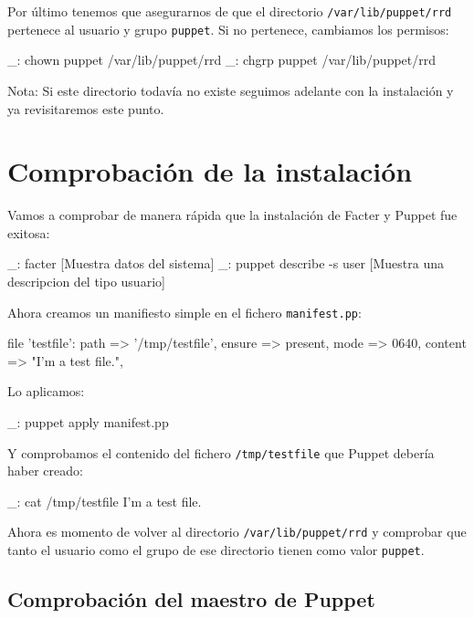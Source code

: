 Por último tenemos que asegurarnos de que el directorio \texttt{/var/lib/puppet/rrd} pertenece al usuario y grupo \texttt{puppet}. Si no pertenece, cambiamos los permisos:

\begin{bashcode}
_: chown puppet /var/lib/puppet/rrd
_: chgrp puppet /var/lib/puppet/rrd
\end{bashcode}

Nota: Si este directorio todavía no existe seguimos adelante con la instalación y ya revisitaremos este punto.


\section{Comprobación de la instalación}

Vamos a comprobar de manera rápida que la instalación de Facter y Puppet fue exitosa:

\begin{bashcode}
_: facter
[Muestra datos del sistema]
_: puppet describe -s user
[Muestra una descripcion del tipo usuario]
\end{bashcode}

Ahora creamos un manifiesto simple en el fichero \texttt{manifest.pp}:

\begin{rubycode}
file {'testfile':
  path    => '/tmp/testfile',
  ensure  => present,
  mode    => 0640,
  content => "I'm a test file.",
}
\end{rubycode}

Lo aplicamos:

\begin{bashcode}
_: puppet apply manifest.pp
\end{bashcode}

Y comprobamos el contenido del fichero \texttt{/tmp/testfile} que Puppet debería haber creado:

\begin{bashcode}
_: cat /tmp/testfile
I'm a test file.
\end{bashcode}

Ahora es momento de volver al directorio \texttt{/var/lib/puppet/rrd} y comprobar que tanto el usuario como el grupo de ese directorio tienen como valor \texttt{puppet}.


\subsection{Comprobación del maestro de Puppet}

